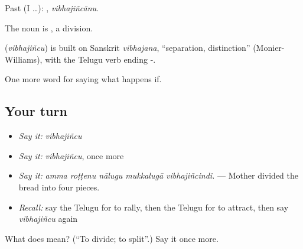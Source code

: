 Past (I …): , \emph{vibhajiñcānu}.

The noun is , a division.

\begin{cousinweb}
\textbf{} (\emph{vibhajiñcu}) is built on Sanskrit \emph{vibhajana}, \textquotedblleft{}separation, distinction\textquotedblright{} (Monier-Williams), with the Telugu verb ending -.
\end{cousinweb}

\begin{grammarlens}[title={What you've built}]
One more word for saying what happens if.
\end{grammarlens}

\subsection*{Your turn}
\begin{itemize}
\raggedright
  \item \emph{Say it:} \emph{vibhajiñcu}
  \item \emph{Say it:} \emph{vibhajiñcu}, once more
  \item \emph{Say it:} \emph{amma roṭṭenu nālugu mukkalugā vibhajiñcindi.} — Mother divided the bread into four pieces.
  \item \emph{Recall:} say the Telugu for to rally, then the Telugu for to attract, then say \emph{vibhajiñcu} again
\end{itemize}

\begin{tcolorbox}[breakable,colback=teal!4,colframe=teal!35!black,title={Before you move on}]
What does  mean? (\textquotedblleft{}To divide; to split\textquotedblright{}.) Say it once more.
\end{tcolorbox}
